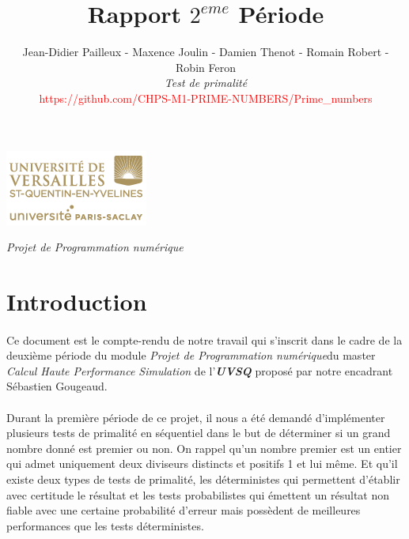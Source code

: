 

\title{\vspace{\fill}\textbf{\Huge Rapport $2^{eme}$ Période}}
\author{Jean-Didier Pailleux - Maxence Joulin - Damien Thenot - Romain Robert - Robin Feron 
	\vspace{2em}\\
	\textit{Test de primalité}\\
	\textcolor{red}{https://github.com/CHPS-M1-PRIME-NUMBERS/Prime\_numbers}
	\vspace{2em}
}
\usepackage{algorithm}
\usepackage{algorithmic}
\usepackage{subcaption}

\clearpage
\maketitle\vspace{13em}
\begin{center}\includegraphics[scale=0.7]{logo.png}\end{center}
\begin{flushright}\textit{Projet de Programmation numérique}\end{flushright}
\newpage
\tableofcontents
\newpage\clearpage{}

	\section{Introduction}
	\paragraph{}Ce document est le compte-rendu de notre travail qui s'inscrit dans le cadre de la deuxième période du module \textit{Projet de Programmation numérique}du master \textit{Calcul Haute Performance Simulation} de l'\textit{\textbf{UVSQ}} proposé par notre encadrant Sébastien Gougeaud.
	
	\paragraph{}Durant la première période de ce projet, il nous a été demandé d'implémenter plusieurs tests de primalité en séquentiel dans le but de déterminer si un grand nombre donné est premier ou non. On rappel qu'un nombre premier est un entier qui admet uniquement deux diviseurs distincts et positifs 1 et lui même. Et qu'il existe deux types de tests de primalité, les déterministes qui permettent d'établir avec certitude le résultat et les tests probabilistes qui émettent un résultat non fiable avec une certaine probabilité d'erreur mais possèdent de meilleures performances que les tests déterministes.

